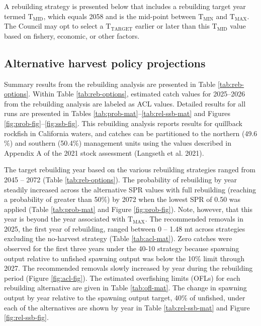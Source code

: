 \documentclass[11pt,
  letterpaper,
]{article}
\begin{document}
A rebuilding strategy is presented below that includes a rebuilding target year termed \(\text{T}_\text{MID}\), which equals 2058 and is the mid-point between \(\text{T}_\text{MIN}\) and \(\text{T}_\text{MAX}\). The Council may opt to select a \(\text{T}_\text{TARGET}\) earlier or later than this \(\text{T}_\text{MID}\) value based on fishery, economic, or other factors.

\hypertarget{alternative-harvest-policy-projections}{%
\subsection{Alternative harvest policy projections}\label{alternative-harvest-policy-projections}}

Summary results from the rebuilding analysis are presented in Table \ref{tab:reb-options}. Within Table \ref{tab:reb-options}, estimated catch values for 2025--2026 from the rebuilding analysis are labeled as ACL values. Detailed results for all runs are presented in Tables \ref{tab:prob-mat}--\ref{tab:rel-ssb-mat} and Figures \ref{fig:prob-fig}--\ref{fig:ssb-fig}. This rebuilding analysis reports results for quillback rockfish in California waters, and catches can be partitioned to the northern (49.6\(\%\)) and southern (50.4\(\%\)) management units using the values described in Appendix A of the 2021 stock assessment (Langseth et al. 2021).

The target rebuilding year based on the various rebuilding strategies ranged from 2045 -- 2072 (Table \ref{tab:reb-options}). The probability of rebuilding by year steadily increased across the alternative SPR values with full rebuilding (reaching a probability of greater than 50\(\%\)) by 2072 when the lowest SPR of 0.50 was applied (Table \ref{tab:prob-mat} and Figure \ref{fig:prob-fig}). Note, however, that this year is beyond the year associated with \(\text{T}_\text{MAX}\). The recommended removals in 2025, the first year of rebuilding, ranged between 0 -- 1.48 mt across strategies excluding the no-harvest strategy (Table \ref{tab:acl-mat}). Zero catches were observed for the first three years under the 40-10 strategy because spawning output relative to unfished spawning output was below the 10\(\%\) limit through 2027. The recommended removals slowly increased by year during the rebuilding period (Figure \ref{fig:acl-fig}). The estimated overfishing limits (OFLs) for each rebuilding alternative are given in Table \ref{tab:ofl-mat}. The change in spawning output by year relative to the spawning output target, 40\(\%\) of unfished, under each of the alternatives are shown by year in Table \ref{tab:rel-ssb-mat} and Figure \ref{fig:rel-ssb-fig}.
\end{document}
